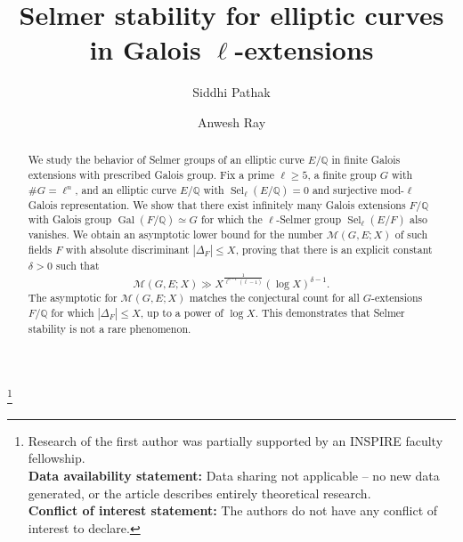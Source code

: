 \documentclass[11pt,reqno]{amsart}
\newcommand{\Q}{\mathbb{Q}}
\numberwithin{equation}{section}
\begin{document}
\title[Selmer stability for elliptic curves]{Selmer stability for elliptic curves in Galois $\ell$-extensions}




\author[S.~Pathak]{Siddhi Pathak}
\address[Pathak]{Chennai Mathematical Institute, H1, SIPCOT IT Park, Kelambakkam, Siruseri, Tamil Nadu 603103, India}


\author[A.~Ray]{Anwesh Ray}
\address[Ray]{Chennai Mathematical Institute, H1, SIPCOT IT Park, Kelambakkam, Siruseri, Tamil Nadu 603103, India}



\thanks{Research of the first author was partially supported by an INSPIRE faculty fellowship. \\
\textbf{Data availability statement:} Data sharing not applicable {--} no new data generated, or the article describes entirely theoretical research. \\
\textbf{Conflict of interest statement:} The authors do not have any conflict of interest to declare.}


\begin{abstract}
We study the behavior of Selmer groups of an elliptic curve \( E/\Q \) in finite Galois extensions with prescribed Galois group. Fix a prime \( \ell \geq 5 \), a finite group \( G \) with $\#G = \ell^n$, and an elliptic curve \( E/\Q \) with \( \operatorname{Sel}_\ell(E/\Q) = 0 \) and surjective mod-\( \ell \) Galois representation. We show that there exist infinitely many Galois extensions \( F/\Q \) with Galois group \( \operatorname{Gal}(F/\Q) \simeq G \) for which the \( \ell \)-Selmer group \( \operatorname{Sel}_\ell(E/F) \) also vanishes. We obtain an asymptotic lower bound for the number \( \mathcal{M}(G, E; X) \) of such fields $F$ with absolute discriminant \( |\Delta_F|\leq X \), proving that there is an explicit constant $\delta>0$ such that
\[
\mathcal{M}(G, E; X) \gg X^{\frac{1}{\ell^{n-1}(\ell - 1)}} (\log X)^{\delta - 1}.
\]
 The asymptotic for $\mathcal{M}(G, E; X)$ matches the conjectural count for all $G$-extensions $F/\Q$ for which $|\Delta_F|\leq X$, up to a power of $\log X$. This demonstrates that Selmer stability is not a rare phenomenon.
\end{abstract}
\end{document}
